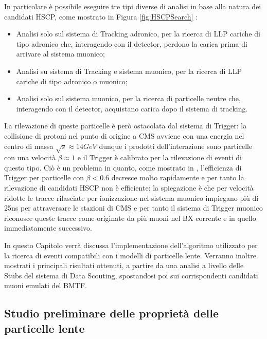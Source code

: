 \newpage

In particolare è possibile eseguire tre tipi diverse di analisi in base alla natura dei candidati HSCP, come mostrato in Figura \ref{fig:HSCPSearch} \cite{MasterThesisGioMoc}: 
\begin{itemize}
   \item Analisi solo sul sistema di Tracking adronico, per la ricerca di LLP cariche di tipo adronico che, interagendo con il detector, perdono la carica prima di arrivare al sistema muonico;
   \item Analisi su sistema di Tracking e sistema muonico, per la ricerca di LLP cariche di tipo adronico o muonico;
   \item Analisi solo sul sistema muonico, per la ricerca di particelle neutre che, interagendo con il detector, acquistano carica dopo il sistema di tracking.
\end{itemize}

La rilevazione di queste particelle è però ostacolata dal sistema di Trigger: la collisione di protoni nel punto di origine a CMS avviene con una energia nel centro di massa $\sqrt{s} \approx 14 \si{GeV}$ dunque i prodotti dell'interazione sono particelle con una velocità $\beta \approx 1$ e il Trigger è calibrato per la rilevazione di eventi di questo tipo. Ciò è un problema in quanto, come mostrato in \cite{MasterThesisGioMoc}, l'efficienza di Trigger per particelle con $\beta < 0.6$ decresce molto rapidamente e per tanto la rilevazione di candidati HSCP non è efficiente: la spiegazione è che per velocità ridotte le tracce rilasciate per ionizzazione nel sistema muonico impiegano più di 25ns per attraversare le stazioni di CMS e per tanto il sistema di Trigger muonico riconosce queste tracce come originate da più muoni nel BX corrente e in quello immediatamente successivo.

In questo Capitolo verrà discussa l'implementazione dell'algoritmo utilizzato per la ricerca di eventi compatibili con i modelli di particelle lente. Verranno inoltre mostrati i principali risultati ottenuti, a partire da una analisi a livello delle Stubs del sistema di Data Scouting, spostandosi poi sui corrispondenti candidati muoni emulati del BMTF.

\subsection{Studio preliminare delle proprietà delle particelle lente}

